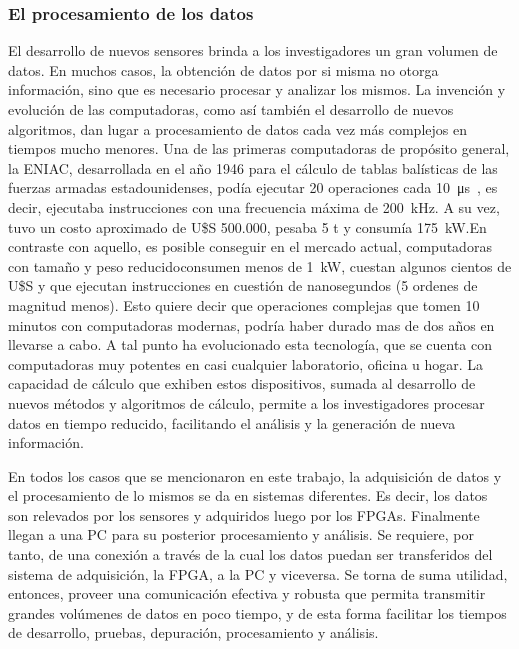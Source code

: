 \subsubsection{El procesamiento de los datos}
El desarrollo de nuevos sensores brinda a los investigadores un gran volumen de datos. En muchos casos, la obtención de datos por si misma no otorga información, sino que es necesario procesar y analizar los mismos. La invención y evolución de las computadoras, como así también el desarrollo de nuevos algoritmos, dan lugar a procesamiento de datos cada vez más complejos en tiempos mucho menores.
Una de las primeras computadoras de propósito general, la ENIAC,  desarrollada en el año 1946 para el cálculo de tablas balísticas de las fuerzas armadas estadounidenses, podía ejecutar 20 operaciones cada \SI{10}{\micro\second}~\cite{Goldstine1946}, es decir, ejecutaba instrucciones con una frecuencia máxima de \SI{200}{\kilo\hertz}. A su vez, tuvo un costo aproximado de U\$S 500.000, pesaba 5 t y consumía \SI{175}{\kilo\watt}.En contraste con aquello, es posible conseguir en el mercado actual, computadoras con tamaño y peso reducidoconsumen menos de \SI{1}{\kilo\watt}, cuestan algunos cientos de U\$S y que ejecutan instrucciones en cuestión de nanosegundos (5 ordenes de magnitud menos). Esto quiere decir que operaciones complejas que tomen 10 minutos con computadoras modernas, podría haber durado mas de dos años en llevarse a cabo. A tal punto ha evolucionado esta tecnología, que se cuenta con computadoras muy potentes en casi cualquier laboratorio, oficina u hogar. La capacidad de cálculo que exhiben estos dispositivos, sumada al desarrollo de nuevos métodos y algoritmos de cálculo, permite a los investigadores procesar datos en tiempo reducido, facilitando el análisis y la generación de nueva información.%

En todos los casos que se mencionaron en este trabajo, la adquisición de datos y el procesamiento de lo mismos se da en sistemas diferentes. Es decir, los datos son relevados por los sensores y adquiridos luego por los FPGAs. Finalmente llegan a una PC para su posterior procesamiento y análisis. Se requiere, por tanto, de una conexión a través de la cual los datos puedan ser transferidos del sistema de adquisición, la FPGA, a la PC y viceversa. Se torna de suma utilidad, entonces, proveer una comunicación efectiva y robusta que permita transmitir grandes volúmenes de datos en poco tiempo, y de esta forma facilitar los tiempos de desarrollo, pruebas, depuración, procesamiento y análisis.%

